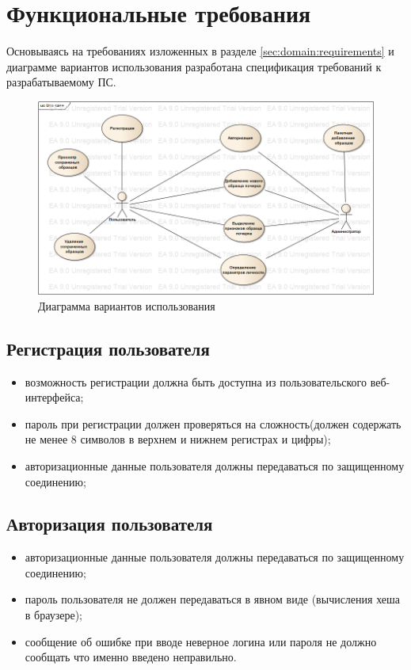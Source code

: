 \section{Функциональные требования}
\label{sec:freq}

Основываясь на требованиях изложенных в разделе \ref{sec:domain:requirements} и диаграмме вариантов использования разработана спецификация требований к разрабатываемому ПС.

\begin{figure}[ht]
\centering
    \includegraphics[scale=0.53]{figures/use_case.png}  
    \caption{Диаграмма вариантов использования}
  \label{fig:freg:usecase}
\end{figure}

\subsection{Регистрация пользователя}
\label{sec:freq:reg}
\begin{itemize}
	\item возможность регистрации должна быть доступна из пользовательского веб-интерфейса;
	\item пароль при регистрации должен проверяться на сложность(должен содержать не менее 8 символов в верхнем и нижнем регистрах и цифры);
	\item авторизационные данные пользователя должны передаваться по защищенному соединению;
\end{itemize}

\subsection{Авторизация пользователя}
\label{sec:freq:auth}
\begin{itemize}
	\item авторизационные данные пользователя должны передаваться по защищенному соединению;
	\item пароль пользователя не должен передаваться в явном виде (вычисления хеша в браузере);
 	\item сообщение об ошибке при вводе неверное логина или пароля не должно сообщать что именно введено неправильно.
\end{itemize}

